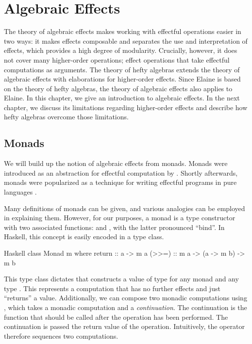\chapter{Algebraic Effects}\label{chap:algebraic_effects}

The theory of algebraic effects makes working with effectful operations easier in two ways: it makes effects composable and separates the use and interpretation of effects, which provides a high degree of modularity. Crucially, however, it does not cover many higher-order operations; effect operations that take effectful computations as arguments. The theory of hefty algebras extends the theory of algebraic effects with elaborations for higher-order effects. Since Elaine is based on the theory of hefty algebras, the theory of algebraic effects also applies to Elaine. In this chapter, we give an introduction to algebraic effects. In the next chapter, we discuss its limitations regarding higher-order effects and describe how hefty algebras overcome those limitations.

\section{Monads}

We will build up the notion of algebraic effects from monads. Monads were introduced as an abstraction for effectful computation by \textcite{moggi_abstract_1989,moggi_computational_1989}. Shortly afterwards, monads were popularized as a technique for writing effectful programs in pure languages \autocite{wadler_essence_1992,peyton_jones_imperative_1993}.

Many definitions of monads can be given, and various analogies can be employed in explaining them. However, for our purposes, a monad is a type constructor with two associated functions:  and \hs{>>=}, with the latter pronounced ``bind''. In Haskell, this concept is easily encoded in a type class.

\begin{lst}{Haskell}
class Monad m where
  return :: a -> m a
  (>>=)  :: m a -> (a -> m b) -> m b
\end{lst}
%
This type class dictates that  constructs a value of type  for any monad  and any type . This represents a computation that has no further effects and just ``returns'' a value. Additionally, we can compose two monadic computations using \hs{>>=}, which takes a monadic computation and a \emph{continuation}. The continuation is the function that should be called after the operation has been performed. The continuation is passed the return value of the operation. Intuitively, the \hs{>>=} operator therefore sequences two computations.

